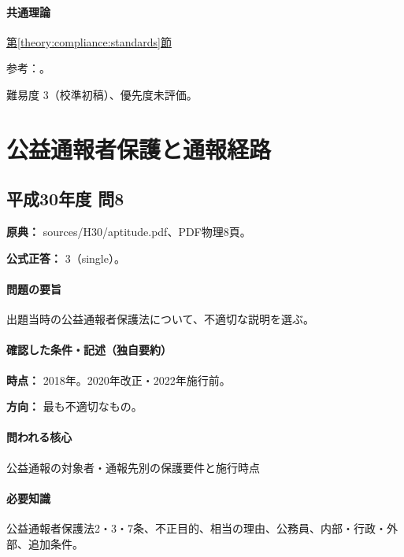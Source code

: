 \paragraph{共通理論} \hyperref[theory:compliance:standards]{第\ref*{theory:compliance:standards}節}

\par 参考：\cite{jisc_isoiec,jisc_certification,jisc_marks,meti_jis2019,mhlw_jis_history}。

\par 難易度 3（校準初稿）、優先度未評価。

\section{公益通報者保護と通報経路}

\subsection{平成30年度 問8}
\label{q:h30-reg-apt-08}

\noindent\textbf{原典：} sources/H30/aptitude.pdf、PDF物理8頁。

\textbf{公式正答：} 3（single）。

\paragraph{問題の要旨} 出題当時の公益通報者保護法について、不適切な説明を選ぶ。

\paragraph{確認した条件・記述（独自要約）}\mbox{}\par

\noindent\textbf{時点：} 2018年。2020年改正・2022年施行前。\par

\noindent\textbf{方向：} 最も不適切なもの。\par

\paragraph{問われる核心} 公益通報の対象者・通報先別の保護要件と施行時点

\paragraph{必要知識} 公益通報者保護法2・3・7条、不正目的、相当の理由、公務員、内部・行政・外部、追加条件。

